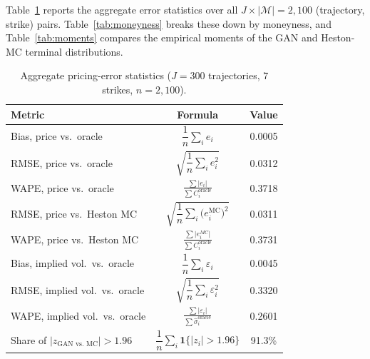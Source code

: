 Table~\ref{tab:overall} reports the aggregate error statistics over all
$J\times|\mathcal M|=2{,}100$ (trajectory, strike) pairs.
Table~\ref{tab:moneyness} breaks these down by moneyness, and
Table~\ref{tab:moments} compares the empirical moments of the GAN and
Heston-MC terminal distributions.\\



\begin{table}[H]
\centering
\small
\caption{Aggregate pricing-error statistics ($J=300$ trajectories,
$7$ strikes, $n=2{,}100$).}
\label{tab:overall}
\begin{tabular}{lcc}
\toprule
Metric & Formula & Value \\
\midrule
Bias, price vs.\ oracle          & $\dfrac1n\sum_i e_i$                                   & 0.0005 \\[1.2ex]
\hline
RMSE, price vs.\ oracle          & $\sqrt{\dfrac1n\sum_i e_i^2}$                         & 0.0312 \\[1.2ex]
\hline
WAPE, price vs.\ oracle           & $\frac{\sum \vert{}e_i\vert{}}{\sum C_i^{\text{oracle}}}$  & 0.3718 \\[1.2ex]
\hline
RMSE, price vs.\ Heston MC       & $\sqrt{\dfrac1n\sum_i \big(e_i^{\text{MC}}\big)^2}$    & 0.0311 \\[1.2ex]
\hline
WAPE, price vs.\ Heston MC        & $\frac{\sum \vert{}e_i^{MC}\vert{}}{\sum C_i^{\text{oracle}}}$             & 0.3731 \\[1.2ex]
\hline
Bias, implied vol.\ vs.\ oracle  & $\dfrac1n\sum_i \varepsilon_i$                         & 0.0045 \\[1.2ex]
\hline
RMSE, implied vol.\ vs.\ oracle  & $\sqrt{\dfrac1n\sum_i \varepsilon_i^2}$                & 0.3320 \\[1.2ex]
\hline
WAPE, implied vol.\ vs.\ oracle   & $\frac{\sum \vert{}\varepsilon_i\vert{}}{\sum \hat\sigma_i^{\text{oracle}}}$                      & 0.2601 \\[1.2ex]
\hline
Share of $|z_{\text{GAN vs.\ MC}}|>1.96$ & $\dfrac1n\sum_i \mathbf 1\{|z_i|>1.96\}$       & 91.3\% \\
\bottomrule
\end{tabular}
\end{table}


